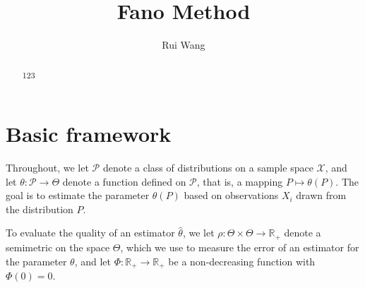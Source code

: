\documentclass[11pt,letterpaper]{article}
\title{Fano Method}
\author{Rui Wang}
\date{\displaydate{date}}
\theoremstyle{plain}
\theoremstyle{definition}
\theoremstyle{remark}
\begin{document}
\maketitle
\begin{abstract}
    123
\end{abstract}
\section{Basic framework}
Throughout, we let $\mathcal{P}$ denote a class of distributions on a sample space $\mathcal{X}$, and let $\theta:\mathcal{P}\to \Theta$ denote a function defined on $\mathcal{P}$, that is, a mapping $P\mapsto \theta(P)$.
The goal is to estimate the parameter $\theta(P)$ based on observations $X_i$ drawn from the distribution $P$.

To evaluate the quality of an estimator $\hat{\theta}$, we let $\rho:\Theta\times\Theta \to \mathbb{R}_{+}$ denote a semimetric on the space $\Theta$, which we use to measure the error of an estimator for the parameter $\theta$, and let $\Phi:\mathbb{R}_+\to \mathbb{R}_+$ be a non-decreasing function with $\Phi(0)=0$.
\end{document}
